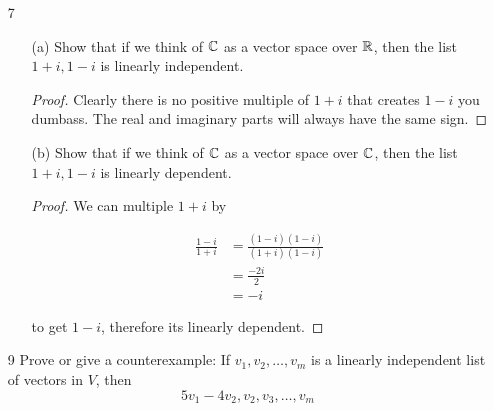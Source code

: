\begin{enumerate}
\begin{proof}
        \[a(3, 1, 4) + b(2, -3, 5) = (5, 9, t)\]

        then our list of vectors in not linearly independent. 
        This turns into these equations:

        \begin{align*}
            3a + 2b &= 5 \\
            a - 3b &= 9 \\
            4a + 5b &= t 
        \end{align*}
        
        We solve, and we get that $a = 3, b = -2, t = 2$, so it is not linearly independent when .
    \end{proof}

    \item[7]
    
    \begin{enumerate}
        \item [(a)] Show that if we think of $\mathbb{C}$ as a vector space over $\mathbb{R}$, then the list $1 + i, 1 - i$ is linearly independent.
        
        \begin{proof}
            Clearly there is no positive multiple of $1 + i$ that creates $1 - i$ you dumbass. The real and imaginary parts will always have the same sign.
        \end{proof}

        \item[(b)] Show that if we think of $\mathbb{C}$ as a vector space over $\mathbb{C}$, then the list $1 + i, 1 - i$ is linearly dependent.
        
        \begin{proof}
            We can multiple $1 + i$ by 

            \begin{align*}
                \frac{1 - i}{1 + i} &= \frac{(1 - i)(1 - i)}{(1 + i)(1 - i)} \\
                &= \frac{-2i}{2} \\
                &= -i
            \end{align*}

            to get $1 - i$, therefore its linearly dependent.
        \end{proof}
    \end{enumerate}

    \item[9] Prove or give a counterexample: If $v_1, v_2, \dots, v_m$ is a linearly independent list of vectors in $V$, then 
    \[5v_1 - 4v_2, v_2, v_3, \dots, v_m\]


\end{enumerate}
